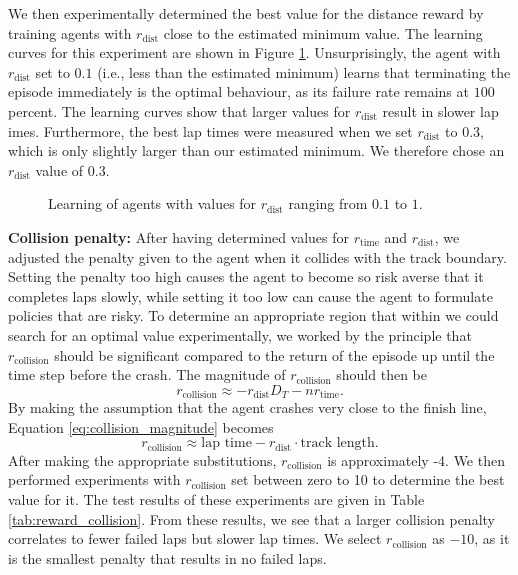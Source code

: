 We then experimentally determined the best value for the distance reward  by training agents with $r_{\text{dist}}$ close to the estimated minimum value. 
The learning curves for this experiment are shown in Figure \ref{fig:reward_signal_dist}.
Unsurprisingly, the agent with $r_{\text{dist}}$ set to $0.1$ (i.e., less than the estimated minimum) learns that terminating the episode immediately is the optimal behaviour, as its failure rate remains at $100$ percent.
The learning curves show that larger values for $r_{\text{dist}}$ result in slower lap imes. 
Furthermore, the best lap times were measured when we set $r_{\text{dist}}$ to $0.3$, which is only slightly larger than our estimated minimum.
We therefore chose an $r_{\text{dist}}$ value of $0.3$.

\begin{figure}[htb!]
    \centering
    
    \caption[Learning curves of agents with different values for $r_{\text{dist}}$ during training]{Learning of agents with values for $r_{\text{dist}}$ ranging from $0.1$ to $1$.}
    \label{fig:reward_signal_dist}
\end{figure}

\textbf{Collision penalty:}
After having determined values for $r_{\text{time}}$ and $r_{\text{dist}}$, we adjusted the penalty given to the agent when it collides with the track boundary. 
Setting the penalty too high causes the agent to become so risk averse that it completes laps slowly, while setting it too low can cause the agent to formulate policies that are risky.
To determine an appropriate region that within we could search for an optimal value experimentally, we worked by the principle that $r_{\text{collision}}$ should be significant compared to the return of the episode up until the time step before the crash. 
The magnitude of $r_{\text{collision}}$ should then be 
\begin{equation}
        r_{\text{collision}} \approx - r_{\text{dist}} D_T  -  n r_{\text{time}}. 
\label{eq:collision_magnitude}
\end{equation}
By making the assumption that the agent crashes very close to the finish line, Equation \ref{eq:collision_magnitude} becomes
\begin{equation}
    r_{\text{collision}} \approx \text{lap time} - r_{\text{dist}} \cdot \text{track length}. 
\end{equation}
After making the appropriate substitutions, $r_{\text{collision}}$ is approximately -4. 
We then performed experiments with $r_{\text{collision}}$ set between zero to 10 to determine the best value for it.
The test results of these experiments are given in Table \ref{tab:reward_collision}.
From these results, we see that a larger collision penalty correlates to fewer failed laps but slower lap times. 
We select $r_{\text{collision}}$ as $-10$, as it is the smallest penalty that results in no failed laps.

